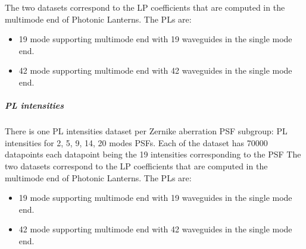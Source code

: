 			The two datasets correspond to the LP coefficients that are computed in the multimode end of Photonic Lanterns. The PLs are:
			\begin{itemize}
				\item 19 mode supporting multimode end with 19 waveguides in the single mode end.
				\item 42 mode supporting multimode end with 42 waveguides in the single mode end.
			\end{itemize}
			
		\subparagraph{PL intensities}
		
			There is one PL intensities dataset per Zernike aberration PSF subgroup: PL intensities for 2, 5, 9, 14, 20 modes PSFs. Each of the dataset has 70000 datapoints each datapoint being the 19 intensities corresponding to the PSF
			The two datasets correspond to the LP coefficients that are computed in the multimode end of Photonic Lanterns. The PLs are:
			\begin{itemize}
				\item 19 mode supporting multimode end with 19 waveguides in the single mode end.
				\item 42 mode supporting multimode end with 42 waveguides in the single mode end.
			\end{itemize}

\finishday